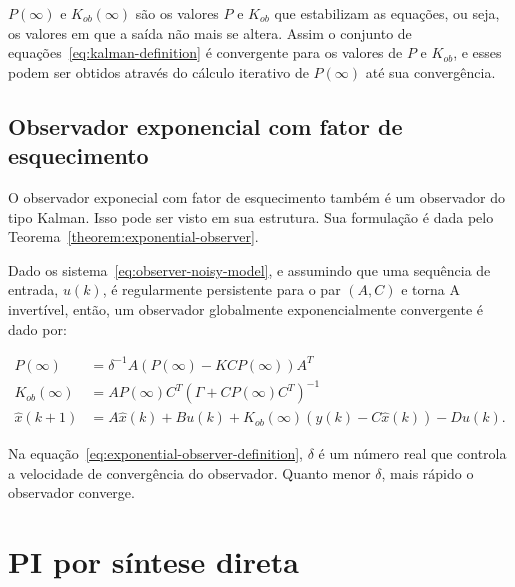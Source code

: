 \( P(\infty) \) e \( K_{ob}(\infty) \) são os valores \( P \) e \( K_{ob} \) que
estabilizam as equações, ou seja, os valores em que a saída não mais se altera.
Assim o conjunto de equações~\eqref{eq:kalman-definition} é convergente para os
valores de \( P \) e \( K_{ob} \), e esses podem ser obtidos através do cálculo
iterativo de \( P(\infty) \) até sua convergência.

\subsection{Observador exponencial com fator de esquecimento}%
\label{subsec:exponential-observer}

O observador exponecial com fator de esquecimento\cite{article:ticlea} também é um
observador do tipo Kalman. Isso pode ser visto em sua estrutura. Sua formulação
é dada pelo Teorema~\ref{theorem:exponential-observer}.

\begin{theorem}%
	\label{theorem:exponential-observer}
	Dado os sistema~\eqref{eq:observer-noisy-model}, e assumindo que uma
	sequência de entrada, \( u(k) \),  é regularmente persistente para o par \(
	(A,C) \) e torna A invertível, então, um observador globalmente
	exponencialmente convergente é dado por:

	\begin{equation}
		\label{eq:exponential-observer-definition}
		\begin{aligned}
			P(\infty)      & =\delta^{-1}A(P(\infty)-KCP(\infty))A^T                           \\
			K_{ob}(\infty) & =AP(\infty)C^T{(\Gamma+CP(\infty)C^T)}^{-1}                       \\
			\hat{x}(k+1)   & = A\hat{x}(k) + Bu(k) + K_{ob}(\infty)(y(k) - C\hat{x}(k))-Du(k).
		\end{aligned}
	\end{equation}
\end{theorem}

Na equação~\eqref{eq:exponential-observer-definition}, \( \delta{} \) é um
número real que controla a velocidade de convergência do observador. Quanto
menor \( \delta{} \), mais rápido o observador converge.

\section{PI por síntese direta}%
\label{sec:pi-direct-synthesis}


